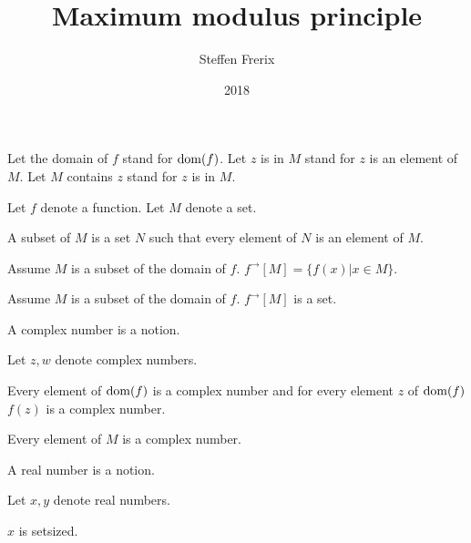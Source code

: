\documentclass{article}
\title{Maximum modulus principle}
\author{Steffen Frerix}
\date{2018}
\newcommand{\image}[2]{#1^{\to}[#2]}
\begin{document}

  \maketitle

  \begin{forthel}

    Let the domain of $f$ stand for $\operatorname{dom}(f)$.
    Let $z$ is in $M$ stand for $z$ is an element of $M$.
    Let $M$ contains $z$ stand for $z$ is in $M$.

    Let $f$ denote a function.
    Let $M$ denote a set.

    \begin{definition}
      A subset of $M$ is a set $N$ such that
      every element of $N$ is an element of $M$.
    \end{definition}

    \begin{definition}
      Assume $M$ is a subset of the domain of $f$.
      $\image{f}{M} = \{ f(x) | x\in M \}$.
    \end{definition}

    \begin{axiom}
      Assume $M$ is a subset of the domain of $f$.
      $\image{f}{M}$ is a set.
    \end{axiom}

    \begin{signature}
      A complex number is a notion.
    \end{signature}

    Let $z, w$ denote complex numbers.

    \begin{axiom}
      Every element of $\operatorname{dom}(f)$ is a complex number and for every element $z$ of $\operatorname{dom}(f)$ $f(z)$ is a complex number.
    \end{axiom}

    \begin{axiom}
      Every element of $M$ is a complex number.
    \end{axiom}

    \begin{signature}
      A real number is a notion.
    \end{signature}

    Let $x,y$ denote real numbers.

    \begin{axiom}
      $x$ is setsized.
    \end{axiom}


\end{forthel}
\end{document}

